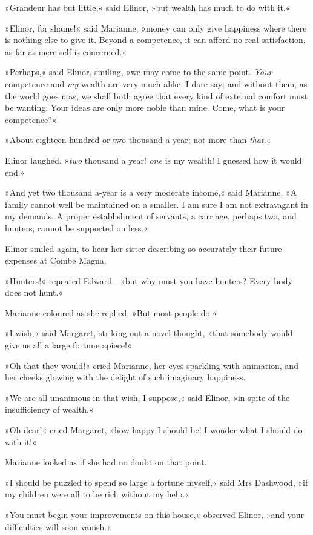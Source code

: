 »Grandeur has but little,« said Elinor, »but wealth has much to do with it.«

»Elinor, for shame!« said Marianne, »money can only give happiness where there is nothing else to give it. Beyond a competence, it can afford no real satisfaction, as far as mere self is concerned.«

»Perhaps,« said Elinor, smiling, »we may come to the same point. \textit{Your} competence and \textit{my} wealth are very much alike, I dare say; and without them, as the world goes now, we shall both agree that every kind of external comfort must be wanting. Your ideas are only more noble than mine. Come, what is your competence?«

»About eighteen hundred or two thousand a year; not more than \textit{that}.«

Elinor laughed. »\textit{two} thousand a year! \textit{one} is my wealth! I guessed how it would end.«

»And yet two thousand a-year is a very moderate income,« said Marianne. »A family cannot well be maintained on a smaller. I am sure I am not extravagant in my demands. A proper establishment of servants, a carriage, perhaps two, and hunters, cannot be supported on less.«

Elinor smiled again, to hear her sister describing so accurately their future expenses at Combe Magna.

»Hunters!« repeated Edward—»but why must you have hunters? Every body does not hunt.«

Marianne coloured as she replied, »But most people do.«

»I wish,« said Margaret, striking out a novel thought, »that somebody would give us all a large fortune apiece!«

»Oh that they would!« cried Marianne, her eyes sparkling with animation, and her cheeks glowing with the delight of such imaginary happiness.

»We are all unanimous in that wish, I suppose,« said Elinor, »in spite of the insufficiency of wealth.«

»Oh dear!« cried Margaret, »how happy I should be! I wonder what I should do with it!«

Marianne looked as if she had no doubt on that point.

»I should be puzzled to spend so large a fortune myself,« said Mrs Dashwood, »if my children were all to be rich without my help.«

»You must begin your improvements on this house,« observed Elinor, »and your difficulties will soon vanish.«

